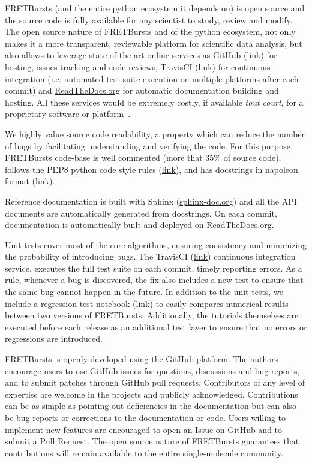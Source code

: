 FRETBursts (and the entire python ecosystem it depends on) is open source
and the source code is fully available for any scientist to study,
review and modify.
The open source nature of FRETBursts and of the python ecosystem,
not only makes it a more transparent, reviewable platform
for scientific data analysis, but also allows
to leverage state-of-the-art online services as GitHub (\href{http://https://github.com}{link}) for hosting,
issues tracking and code reviews, TravisCI
(\href{https://travis-ci.org}{link}) for continuous integration
(i.e. automated test suite execution on multiple platforms after each commit)
and \href{https://readthedocs.org/}{ReadTheDocs.org} for automatic documentation building and hosting.
All these services would be extremely costly, if available \textit{tout court},
for a proprietary software or platform~\cite{Freeman_2015}.

We highly value source code readability, a property which can
reduce the number of bugs by facilitating understanding and verifying the code.
For this purpose, FRETBursts code-base is well commented (more that 35\%
of source code),
follows the PEP8 python code style rules (\href{https://www.python.org/dev/peps/pep-0008/}{link}),
and has docstrings in napoleon format (\href{http://sphinxcontrib-napoleon.readthedocs.org/}{link}).

Reference documentation is built with Sphinx (\href{http://sphinx-doc.org/}{sphinx-doc.org})
and all the API documents are automatically generated from docstrings.
On each commit, documentation is automatically built and deployed on
\href{https://readthedocs.org/}{ReadTheDocs.org}.

Unit tests cover most of the core algorithms, ensuring consistency and
minimizing the probability of introducing bugs.
The TravisCI (\href{http://travis-ci.org}{link}) continuous integration service,
executes the full test suite on each commit, timely reporting errors.
As a rule, whenever a bug is discovered, the  fix also includes a new test
to ensure that the same bug cannot happen in the future.
In addition to the unit tests, we include a regression-test notebook
(\href{https://github.com/tritemio/FRETBursts/blob/master/notebooks/dev/tests/FRETBursts%20-%20Regression%20tests.ipynb}{link})
to easily compares numerical results between two versions of FRETBursts.
Additionally, the tutorials themselves are executed before each release as
an additional test layer to ensure that no errors or regressions are introduced.

FRETBursts is openly developed using the GitHub platform.
The authors encourage users to use GitHub issues for questions, discussions
and bug reports, and to submit patches through GitHub pull requests.
Contributors of any level of expertise are welcome in the projects
and publicly acknowledged.
Contributions can be as simple as pointing out deficiencies in the
documentation but can also be bug reports or corrections to
the documentation or code. Users willing to implement
new features are encouraged to open an Issue on GitHub and to submit
a Pull Request. The open source nature of FRETBursts guarantees that
contributions will remain available to the entire single-molecule
community.

